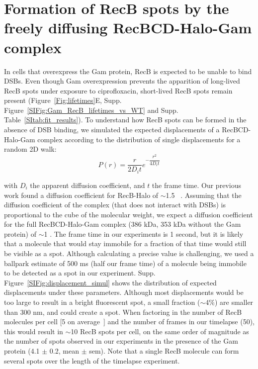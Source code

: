\section{Formation of RecB spots by the freely diffusing RecBCD-Halo-Gam complex}\label{note:spurious_spots}
In cells that overexpress the Gam protein, RecB is expected to be unable to bind DSBs. Even though Gam overexpression prevents the apparition of long-lived RecB spots under exposure to ciprofloxacin, short-lived RecB spots remain present (Figure~\ref{Fig:lifetimes}E, Supp. Figure~\ref{SIFig:Gam_RecB_lifetimes_vs_WT} and Supp. Table~\ref{SItab:fit_results}). To understand how RecB spots can be formed in the absence of DSB binding, we simulated the expected displacements of a RecBCD-Halo-Gam complex according to the distribution of single displacements for a random 2D walk:
\begin{equation}
    P(r) = \dfrac{r}{2D_i t}e^{-\dfrac{r^2}{4D_i t}}
\end{equation}

with $D_i$ the apparent diffusion coefficient, and $t$ the frame time. Our previous work found a diffusion coefficient for RecB-Halo of $\sim$1.5 \ums\ \cite{Lepore2025}. Assuming that the diffusion coefficient of the complex (that does not interact with DSBs) is proportional to the cube of the molecular weight, we expect a diffusion coefficient for the full RecBCD-Halo-Gam complex (386 kDa, 353 kDa without the Gam protein) of $\sim$1 \ums. The frame time in our experiments is 1 second, but it is likely that a molecule that would stay immobile for a fraction of that time would still be visible as a spot. Although calculating a precise value is challenging, we used a ballpark estimate of 500 ms (half our frame time) of a molecule being immobile to be detected as a spot in our experiment. Supp. Figure~\ref{SIFig:displacement_simul} shows the distribution of expected displacements under these parameters. Although most displacements would be too large to result in a bright fluorescent spot, a small fraction ($\sim$4\%) are smaller than 300 nm, and could create a spot. When factoring in the number of RecB molecules per cell [5 on average~\cite{Lepore2019a}] and the number of frames in our timelapse (50), this would result in $\sim$10 RecB spots per cell, on the same order of magnitude as the number of spots observed in our experiments in the presence of the Gam protein (4.1 $\pm$ 0.2, mean $\pm$ sem). Note that a single RecB molecule can form several spots over the length of the timelapse experiment.

